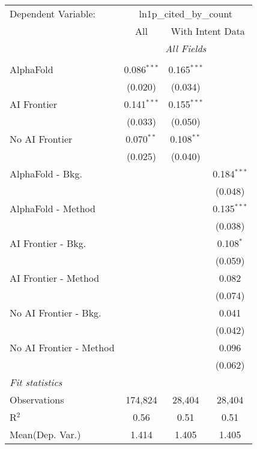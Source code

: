 \begingroup
\centering
\begin{tabular}{lccc}
   \tabularnewline \midrule \midrule
   Dependent Variable: & \multicolumn{3}{c}{ln1p\_cited\_by\_count}\\
 & \multicolumn{1}{c}{All} & \multicolumn{2}{c}{With Intent Data} \\
\cmidrule(lr){2-2} \cmidrule(lr){3-4}
 & \multicolumn{3}{c}{\textit{All Fields}} \\ \\
   AlphaFold               & 0.086$^{***}$ & 0.165$^{***}$ &   \\   
                           & (0.020)       & (0.034)       &   \\   
   AI Frontier             & 0.141$^{***}$ & 0.155$^{***}$ &   \\   
                           & (0.033)       & (0.050)       &   \\   
   No AI Frontier          & 0.070$^{**}$  & 0.108$^{**}$  &   \\   
                           & (0.025)       & (0.040)       &   \\   
   AlphaFold - Bkg.        &               &               & 0.184$^{***}$\\   
                           &               &               & (0.048)\\   
   AlphaFold - Method      &               &               & 0.135$^{***}$\\   
                           &               &               & (0.038)\\   
   AI Frontier - Bkg.      &               &               & 0.108$^{*}$\\   
                           &               &               & (0.059)\\   
   AI Frontier - Method    &               &               & 0.082\\   
                           &               &               & (0.074)\\   
   No AI Frontier - Bkg.   &               &               & 0.041\\   
                           &               &               & (0.042)\\   
   No AI Frontier - Method &               &               & 0.096\\   
                           &               &               & (0.062)\\   
   \midrule
   \emph{Fit statistics}\\
   Observations            & 174,824       & 28,404        & 28,404\\  
   R$^2$                   & 0.56          & 0.51          & 0.51\\  
Mean(Dep. Var.) & 1.414 & 1.405 & 1.405 \\
   

\end{tabular}
